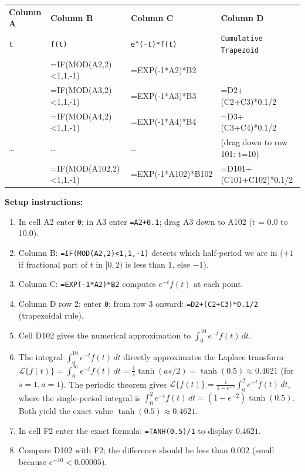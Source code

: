 \documentclass[12pt,a4paper]{article}
\begin{document}
\medskip
\begin{center}
\renewcommand{\arraystretch}{1.3}
\begin{tabular}{>{\ttfamily}l >{\ttfamily}l >{\ttfamily}l >{\ttfamily}l}
\toprule
\textbf{Column A} & \textbf{Column B} & \textbf{Column C} & \textbf{Column D} \\
\texttt{t} & \texttt{f(t)} & \texttt{e\textasciicircum(-t)*f(t)} & \texttt{Cumulative Trapezoid} \\
\midrule
0.0  & =IF(MOD(A2,2)<1,1,-1) & =EXP(-1*A2)*B2  & 0 \\
0.1  & =IF(MOD(A3,2)<1,1,-1) & =EXP(-1*A3)*B3  & =D2+(C2+C3)*0.1/2 \\
0.2  & =IF(MOD(A4,2)<1,1,-1) & =EXP(-1*A4)*B4  & =D3+(C3+C4)*0.1/2 \\
\ldots & \ldots & \ldots & (drag down to row 101: t=10) \\
10.0 & =IF(MOD(A102,2)<1,1,-1) & =EXP(-1*A102)*B102 & =D101+(C101+C102)*0.1/2 \\
\bottomrule
\end{tabular}
\end{center}

\textbf{Setup instructions:}
\begin{enumerate}
  \item In cell A2 enter \texttt{0}; in A3 enter \texttt{=A2+0.1}; drag A3 down to A102 (t = 0.0 to 10.0).
  \item Column B: \texttt{=IF(MOD(A2,2)<1,1,-1)} detects which half-period we are in ($+1$ if fractional part of $t$ in $[0,2)$ is less than 1, else $-1$).
  \item Column C: \texttt{=EXP(-1*A2)*B2} computes $e^{-t}f(t)$ at each point.
  \item Column D row 2: enter \texttt{0}; from row 3 onward: \texttt{=D2+(C2+C3)*0.1/2} (trapezoidal rule).
  \item Cell D102 gives the numerical approximation to $\int_0^{10} e^{-t}f(t)\,dt$.
  \item The integral $\int_0^{10} e^{-t}f(t)\,dt$ directly approximates the Laplace transform $\mathcal{L}\{f(t)\} = \int_0^{\infty} e^{-t}f(t)\,dt = \frac{1}{s}\tanh(as/2) = \tanh(0.5) \approx 0.4621$ (for $s=1, a=1$). The periodic theorem gives $\mathcal{L}\{f(t)\} = \frac{1}{1-e^{-2}}\int_0^2 e^{-t}f(t)\,dt$, where the single-period integral is $\int_0^2 e^{-t}f(t)\,dt = (1-e^{-2})\tanh(0.5)$. Both yield the exact value $\tanh(0.5) \approx 0.4621$.
  \item In cell F2 enter the exact formula: \texttt{=TANH(0.5)/1} to display $0.4621$.
  \item Compare D102 with F2; the difference should be less than $0.002$ (small because $e^{-10} < 0.00005$).
\end{enumerate}
\end{document}
